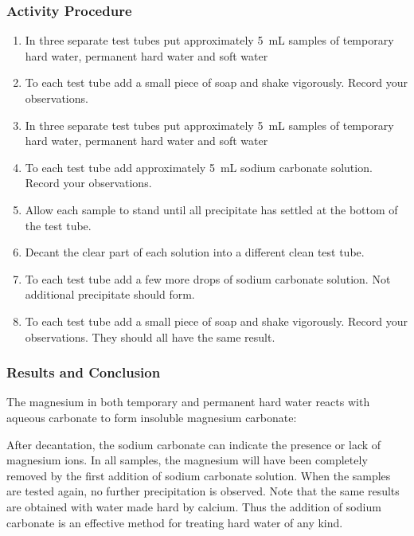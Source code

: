{{\subsubsection*{Activity Procedure}
\begin{enumerate}
\item{In three separate test tubes put approximately 5~mL samples of temporary hard water, permanent hard water and soft water}
\item{To each test tube add a small piece of soap and shake vigorously. Record your observations.}
\item{In three separate test tubes put approximately 5~mL samples of temporary hard water, permanent hard water and soft water}
\item{To each test tube add approximately  5~mL sodium carbonate solution. Record your observations.}
\item{Allow each sample to stand until all precipitate has settled at the bottom of the test tube.}
\item{Decant the clear part of each solution into a different clean test tube.}
\item{To each test tube add a few more drops of sodium carbonate solution. Not additional precipitate should form.}
\item{To each test tube add a small piece of soap and shake vigorously. Record your observations. They should all have the same result.}
\end{enumerate}

\subsubsection*{Results and Conclusion}
The magnesium in both temporary and permanent hard water reacts with aqueous carbonate to form insoluble magnesium carbonate:

\begin{center}
\end{center}

After decantation, the sodium carbonate can indicate the presence or lack of magnesium ions. In all samples, the magnesium will have been completely removed by the first addition of sodium carbonate solution. When the samples are tested again, no further precipitation is observed. Note that the same results are obtained with water made hard by calcium. Thus the addition of sodium carbonate is an effective method for treating hard water of any kind.

}}
